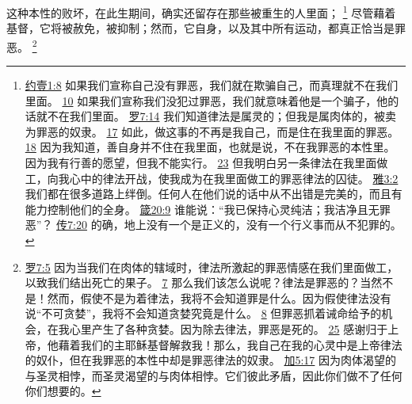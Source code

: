 \documentclass[12pt, a4paper, oneside]{ctexart}
\newcounter{parnum}[section]
\newcommand{\N}{%
   \noindent\refstepcounter{parnum}%
    \makebox[\parindent][l]{\textbf{\arabic{parnum}.}}}
\begin{document}
\N 这种本性的败坏，在此生期间，确实还留存在那些被重生的人里面；
	\footnote {
		\href{https://biblehub.com/1_john/1-8.htm}{约壹1:8} 如果我们宣称自己没有罪恶，我们就在欺骗自己，而真理就不在我们里面。
		\href{https://biblehub.com/1_john/1-10.htm}{10} 如果我们宣称我们没犯过罪恶，我们就意味着他是一个骗子，他的话就不在我们里面。
		\href{https://biblehub.com/romans/7-14.htm}{罗7:14} 我们知道律法是属灵的；但我是属肉体的，被卖为罪恶的奴隶。
		\href{https://biblehub.com/romans/7-17.htm}{17} 如此，做这事的不再是我自己，而是住在我里面的罪恶。\href{https://biblehub.com/romans/7-18.htm}{18} 因为我知道，善自身并不住在我里面，也就是说，不在我罪恶的本性里。因为我有行善的愿望，但我不能实行。
		\href{https://biblehub.com/romans/7-23.htm}{23} 但我明白另一条律法在我里面做工，向我心中的律法开战，使我成为在我里面做工的罪恶律法的囚徒。
		\href{https://biblehub.com/james/3-2.htm}{雅3:2} 我们都在很多道路上绊倒。任何人在他们说的话中从不出错是完美的，而且有能力控制他们的全身。
		\href{https://biblehub.com/proverbs/20-9.htm}{箴20:9} 谁能说：“我已保持心灵纯洁；我洁净且无罪恶”？
		\href{https://biblehub.com/ecclesiastes/7-20.htm}{传7:20} 的确，地上没有一个是正义的，没有一个行义事而从不犯罪的。
	}
	尽管藉着基督，它将被赦免，被抑制；然而，它自身，以及其中所有运动，都真正恰当是罪恶。
	\footnote {
		\href{https://biblehub.com/romans/7-5.htm}{罗7:5} 因为当我们在肉体的辖域时，律法所激起的罪恶情感在我们里面做工，以致我们结出死亡的果子。
		\href{https://biblehub.com/romans/7-7.htm}{7} 那么我们该怎么说呢？律法是罪恶的？当然不是！然而，假使不是为着律法，我将不会知道罪是什么。因为假使律法没有说“不可贪婪”，我将不会知道贪婪究竟是什么。
		\href{https://biblehub.com/romans/7-8.htm}{8} 但罪恶抓着诫命给予的机会，在我心里产生了各种贪婪。因为除去律法，罪恶是死的。
		\href{https://biblehub.com/romans/7-25.htm}{25} 感谢归于上帝，他藉着我们的主耶稣基督解救我！那么，我自己在我的心灵中是上帝律法的奴仆，但在我罪恶的本性中却是罪恶律法的奴隶。
		\href{https://biblehub.com/galatians/5-17.htm}{加5:17} 因为肉体渴望的与圣灵相悖，而圣灵渴望的与肉体相悖。它们彼此矛盾，因此你们做不了任何你们想要的。
	}
\end{document}
